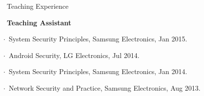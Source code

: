 \documentclass{resume} %
\begin{document}

\begin{rSection}{\faGenderless~Teaching Experience}

	\textbullet~{\bf Teaching Assistant} \\
		\strut\hspace{1cm}$\cdot$~System Security Principles, Samsung Electronics, Jan 2015.\\
		\strut\hspace{1cm}$\cdot$~Android Security, LG Electronics, Jul 2014.\\
		\strut\hspace{1cm}$\cdot$~System Security Principles, Samsung Electronics, Jan 2014.\\
		\strut\hspace{1cm}$\cdot$~Network Security and Practice, Samsung Electronics, Aug 2013.
\end{rSection}	
\vspace{3mm}

\end{document}
